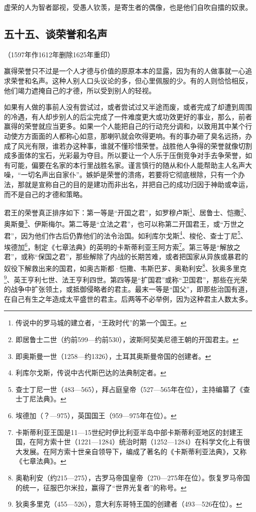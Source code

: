 \par 虚荣的人为智者鄙视，受愚人钦羡，是寄生者的偶像，也是他们自吹自擂的奴隶。



\subsection*{五十五、谈荣誉和名声}
\begin{center}
    （1597年作1612年删除1625年重印）
\end{center}

\par 赢得荣誉只不过是一个人才德与价值的原原本本的显露，因为有的人做事就一心追求荣誉和名声。这种人别人口头议论的多，但心里佩服的少。有的人则恰恰相反，他们竭力遮掩自己的才德，所以受到别人的轻视。
\par 如果有人做的事前人没有尝试过，或者尝试过又半途而废，或者完成了却遭到周围的冷遇，有人却步别人的后尘完成了一件难度更大或功效更好的事业，那么，前者赢得的荣誉就应当更多。如果一个人能把自己的行动充分调和，以致用其中某个行动使方方面面的人都称心如意，那喇叭就会吹得更响。有的事办砸了臭名远扬，办成了风光有限，谁若办这种事，谁就不懂珍惜荣誉。战胜他人争得的荣誉就像切割成多面体的宝石，光彩最为夺目。所以要让一个人乐于压倒竞争对手去争荣誉，如有可能，偏要在名家的本行里战胜名家。谨言慎行的随从和仆人能帮助主人名声大噪，“一切名声出自家仆”。嫉妒是荣誉的溃疡，若要将它彻底根除，只有一个办法，那就是宣称自己的目的是建功而非出名，并把自己的成功归因于神助或幸运，而不是自己的才德和策略。
\par 君王的荣誉真正排序如下：第一等是“开国之君”，如罗穆卢斯\footnote{传说中的罗马城的建立者，“王政时代”的第一个国王。}、居鲁士、恺撒\footnote{即居鲁士二世（约前599—约前530），波斯阿契美尼德王朝的开国君主。}、奥斯曼\footnote{即奥斯曼一世（1258—约1326），土耳其奥斯曼帝国的创建者。}、伊斯梅尔。第二等是“立法之君”，也可以称第二开国君王，或“万世之君”，因为他们作古后仍靠他们的法令治国。如利库尔戈斯\footnote{利库尔戈斯，传说中古代斯巴达的法典制定者。}、梭伦、查士丁尼\footnote{查士丁尼一世（483—565），拜占庭皇帝（527—565年在位），主持编纂了《查士丁尼法典》。}、埃德加\footnote{埃德加（？—975），英国国王（959—975年在位）。}，制定《七章法典》的英明的卡斯蒂利亚王阿方索\footnote{卡斯蒂利亚王国是11—15世纪时伊比利亚半岛中部卡斯蒂利亚地区的封建王国，在阿方索十世（1221—1284）统治时期（1252—1284）在科学文化上有很大发展。在阿方索十世亲自领导下，编成了著名的《卡斯蒂利亚法典》，又称《七章法典》。}。第三等是“解放之君”，或称“保国之君”，那些解除了内战的长期苦难，或者把国家从异族或暴君的奴役下解救出来的国君，如奥古斯都·恺撒、韦斯巴芗、奥勒利安\footnote{奥勒利安（约215—275），古罗马帝国皇帝（270—275年在位）。恢复罗马帝国的统一，征服巴尔米拉，赢得了“世界光复者”的称号。}、狄奥多里克\footnote{狄奥多里克（455—526），意大利东哥特王国的创建者（493—526在位）。}、英王亨利七世、法王亨利四世。第四等是“扩国君”或称“卫国君”，那些在光荣的战争中扩张领土，或抵御侵略者的君主。最末一等是“国父”，即那些治国有道，在自己有生之年造成太平盛世的君主。后两等不必举例，因为这种君主人数太多。
